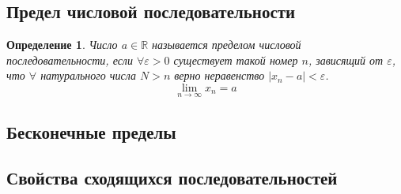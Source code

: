\documentclass[a4paper,12pt]{article} %
\newtheorem{definition}{Определение}[subsection]
\theoremstyle{remark}
\begin{document}
\subsection{Предел числовой последовательности}
\begin{definition}
	Число $a\in\mathbb{R}$ называется пределом числовой последовательности, если $\forall \varepsilon>0$ существует такой номер $n$, зависящий от $\varepsilon$, что $\forall$ натурального числа $N>n$ верно неравенство $|x_n - a| < \varepsilon$.
	$$\lim_{n\to\infty} x_n = a$$
\end{definition}

\subsection{Бесконечные пределы}
\subsection{Свойства сходящихся последовательностей}
\end{document}
